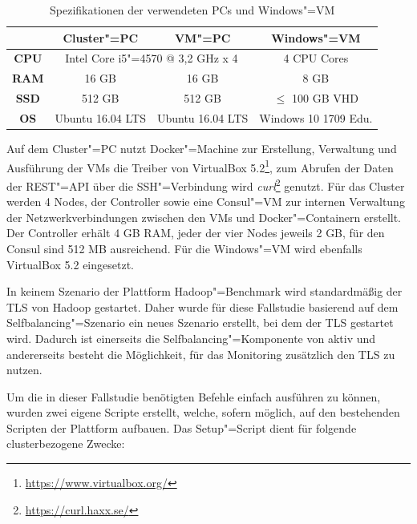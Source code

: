 \begin{table}
    \begin{tabular}{|c|c|c|c|}
    	\hline
    	 \textbf{}   & \textbf{Cluster"=PC} &          \textbf{VM"=PC}          & \textbf{Windows"=VM}  \\ \hline\hline
    	\textbf{CPU} & \multicolumn{2}{|c|}{Intel Core i5"=4570 @ 3,2 GHz x 4} &     4 CPU Cores      \\ \hline
    	\textbf{RAM} &        16 GB        &              16 GB               &         8 GB         \\ \hline
    	\textbf{SSD} &       512 GB        &              512 GB              &  $\leq$ 100 GB VHD   \\ \hline
    	\textbf{OS}  &  Ubuntu 16.04 LTS   &         Ubuntu 16.04 LTS         & Windows 10 1709 Edu. \\ \hline
    \end{tabular}
    \caption{Spezifikationen der verwendeten PCs und Windows"=VM}
    \label{tab:pcSpecs}
\end{table}

Auf dem Cluster"=PC nutzt Docker"=Machine zur Erstellung, Verwaltung und Ausführung der VMs die Treiber von VirtualBox 5.2\footnote{\url{https://www.virtualbox.org/}}, zum Abrufen der Daten der REST"=API über die SSH"=Verbindung wird \emph{curl}\footnote{\url{https://curl.haxx.se/}} genutzt.
Für das Cluster werden 4 Nodes, der Controller sowie eine Consul"=VM zur internen Verwaltung der Netzwerkverbindungen zwischen den VMs und Docker"=Containern erstellt.
Der Controller erhält 4 GB RAM, jeder der vier Nodes jeweils 2 GB, für den Consul sind 512 MB ausreichend.
Für die Windows"=VM wird ebenfalls VirtualBox 5.2 eingesetzt.

In keinem Szenario der Plattform Hadoop"=Benchmark wird standardmäßig der \ac{TLS} von Hadoop gestartet.
Daher wurde für diese Fallstudie basierend auf dem Selfbalancing"=Szenario ein neues Szenario erstellt, bei dem der \ac{TLS} gestartet wird.
Dadurch ist einerseits die Selfbalancing"=Komponente von \citeauthor{zhang2016} aktiv und andererseits besteht die Möglichkeit, für das Monitoring zusätzlich den \ac{TLS} zu nutzen.

Um die in dieser Fallstudie benötigten Befehle einfach ausführen zu können, wurden zwei eigene Scripte erstellt, welche, sofern möglich, auf den bestehenden Scripten der Plattform aufbauen.
Das Setup"=Script dient für folgende clusterbezogene Zwecke:

